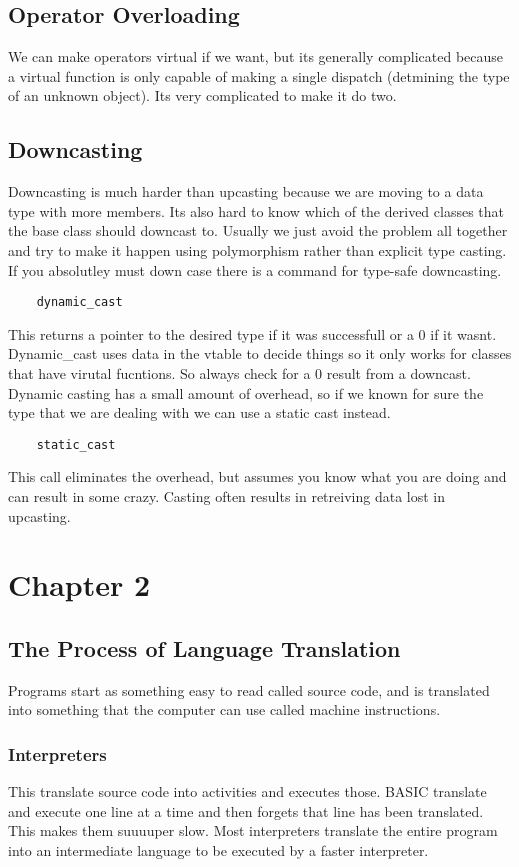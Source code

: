 \documentclass[12pt]{article}
\begin{document}
\subsection*{Operator Overloading}
We can make operators virtual if we want, but its generally complicated because a virtual function is only capable of making a single dispatch (detmining the type of an unknown object). Its very complicated to make it do two.

\subsection*{Downcasting}
Downcasting is much harder than upcasting because we are moving to a data type with more members. Its also hard to know which of the derived classes that the base class should downcast to. Usually we just avoid the problem all together and try to make it happen using polymorphism rather than explicit type casting. If you absolutley must down case there is a command for type-safe downcasting.
\begin{lstlisting}
    dynamic_cast
\end{lstlisting}
This returns a pointer to the desired type if it was successfull or a 0 if it wasnt. Dynamic\_cast uses data in the vtable to decide things so it only works for classes that have virutal fucntions. So always check for a 0 result from a downcast. Dynamic casting has a small amount of overhead, so if we known for sure the type that we are dealing with we can use a static cast instead.
\begin{lstlisting}
    static_cast
\end{lstlisting}
This call eliminates the overhead, but assumes you know what you are doing and can result in some crazy. Casting often results in retreiving data lost in upcasting.


\section*{Chapter 2}
\subsection*{The Process of Language Translation}
Programs start as something easy to read called source code, and is translated into something that the computer can use called machine instructions.
\subsubsection*{Interpreters}
This translate source code into activities and executes those. BASIC translate and execute one line at a time and then forgets that line has been translated. This makes them suuuuper slow. Most interpreters translate the entire program into an intermediate language to be executed by a faster interpreter.
\end{document}
